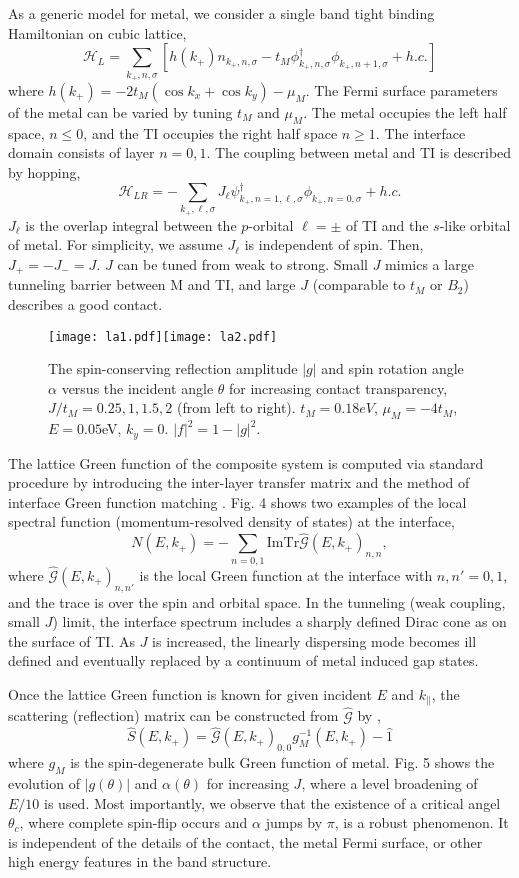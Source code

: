 \documentclass[11pt,revtex,aps]{report}
\newcommand{\kp}{k_{+}}
\begin{document}
As a generic model for metal, we consider a single band tight binding Hamiltonian on cubic lattice,
\[
\mathscr{H}_L=\sum_{\kp,n,\sigma}[h({\kp})  n_{\kp,n,\sigma}
- t_M \phi_{\kp,n,\sigma}^\dagger  \phi_{\kp,n+1,\sigma} + h.c.] 
\]
where $h(\kp)=-2t_M(\cos k_x+\cos k_y)-\mu_M$. 
The Fermi surface parameters of the metal can be varied by tuning $t_M$ and $\mu_M$.
The metal occupies the left half space, $n\leq 0$, and 
the TI occupies the right half space $n\geq 1$. The interface domain consists of layer $n=0,1$. 
The coupling between metal and TI is described by hopping,
\[
\mathscr{H}_{LR}=-\sum_{\kp,\ell,\sigma}J_{\ell}\psi^{\dagger}_{\kp,n=1,\ell,\sigma}\phi_{\kp,n=0,\sigma}+h.c.
\]
$J_{\ell}$ is the overlap integral between the $p$-orbital $\ell=\pm$ of TI and the $s$-like orbital of metal. For simplicity, we assume $J_{\ell}$ is independent of spin. Then, $J_{+}=-J_{-}=J$. $J$ can be tuned from weak to strong. Small $J$ mimics a large tunneling barrier between M and TI, 
and large $J$ (comparable to $t_M$ or $B_2$) describes a good contact. 

\begin{figure}
\center
\texttt{[image: la1.pdf]}\texttt{[image: la2.pdf]}
\caption{The spin-conserving reflection amplitude $|g|$ and spin rotation angle 
$\alpha$ versus the incident angle $\theta$ for increasing contact transparency,
$J/t_M=0.25, 1, 1.5, 2$ (from left to right). $t_M=0.18eV$, $\mu_M=-4t_M$, $E=0.05$eV, $k_y=0$.
$|f|^2=1-|g|^2$. 
}
\end{figure}

The lattice Green function of the composite system is computed via 
standard procedure by introducing the inter-layer transfer matrix 
and the method of interface Green function matching \cite{gf}. 
Fig. 4 shows two examples of the local spectral function 
(momentum-resolved density of states) at the interface,
\[ 
N(E,\kp)=-\sum_{n=0,1}\mathrm{Im Tr}\hat{\mathscr{G}}(E,\kp)_{n,n}, 
\]
where $\hat{\mathscr{G}}(E,\kp)_{n,n'}$ is 
the local Green function at the interface with $n,n'=0,1$, and  
the trace is over the spin and orbital space. 
In the tunneling (weak coupling, small $J$) limit, the interface spectrum includes 
a sharply defined Dirac cone as on the surface of TI. As $J$ is increased, 
the linearly dispersing mode becomes ill defined and eventually replaced 
by a continuum of metal induced gap states.

Once the lattice Green function is known for given incident $E$ and $k_{\parallel}$, 
the scattering (reflection) matrix can be constructed from $\hat{\mathscr{G}}$ by \cite{gf},
\[
\hat{S}(E,\kp)=\hat{\mathscr{G}}(E,\kp)_{0,0}g_M^{-1}(E,\kp)-\hat{1}
\]
where $g_M$ is the spin-degenerate bulk Green function of metal. Fig. 5 shows
the evolution of $|g(\theta)|$ and $\alpha(\theta)$ for increasing $J$, where 
a level broadening of $E/10$ is used. Most importantly,
we observe that the existence of a critical angel $\theta_c$, 
where complete spin-flip occurs and $\alpha$ jumps by $\pi$, is a robust phenomenon. 
It is independent of the details of the contact, the metal Fermi 
surface, or other high energy features in the band structure.
\end{document}
